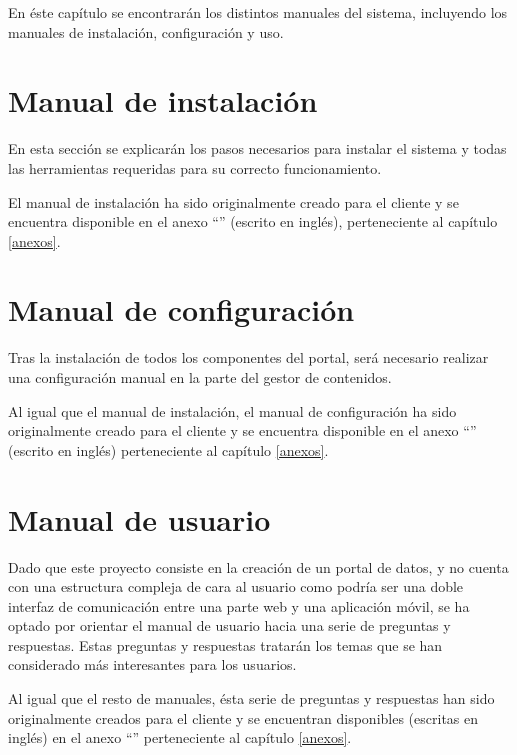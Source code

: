 En éste capítulo se encontrarán los distintos manuales del sistema, incluyendo los manuales de instalación, configuración y uso.

\section{Manual de instalación}
En esta sección se explicarán los pasos necesarios para instalar el sistema y todas las herramientas requeridas para su correcto funcionamiento.

El manual de instalación ha sido originalmente creado para el cliente y se encuentra disponible en el anexo ``'' (escrito en inglés), perteneciente al capítulo \ref{anexos}.


\section{Manual de configuración}
Tras la instalación de todos los componentes del portal, será necesario realizar una configuración manual en la parte del gestor de contenidos.

Al igual que el manual de instalación, el manual de configuración ha sido originalmente creado para el cliente y se encuentra disponible en el anexo ``'' (escrito en inglés) perteneciente al capítulo \ref{anexos}.

\section{Manual de usuario}
Dado que este proyecto consiste en la creación de un portal de datos, y no cuenta con una estructura compleja de cara al usuario como podría ser una doble interfaz de comunicación entre una parte web y una aplicación móvil, se ha optado por orientar el manual de usuario hacia una serie de preguntas y respuestas.
Estas preguntas y respuestas tratarán los temas que se han considerado más interesantes para los usuarios.

Al igual que el resto de manuales, ésta serie de preguntas y respuestas han sido originalmente creados para el cliente y se encuentran disponibles (escritas en inglés) en el anexo ``'' perteneciente al capítulo \ref{anexos}.